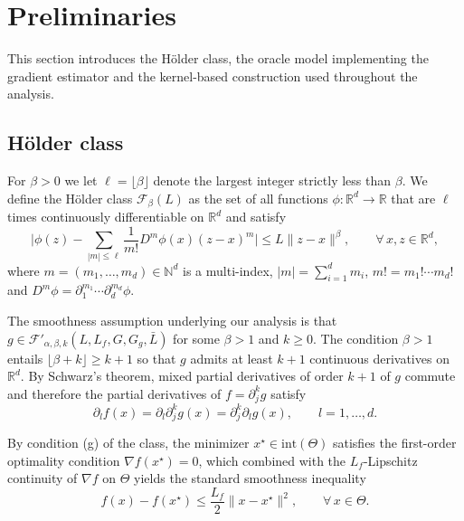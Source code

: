 \documentclass{article}
\renewcommand{\leq}{\leqslant}
\renewcommand{\geq}{\geqslant}
\theoremstyle{definition}
\begin{document}
\section{Preliminaries}
\label{sec:prel}

This section introduces the H\"older class, the oracle model 
implementing the gradient estimator and the kernel-based 
construction used throughout the analysis.

\subsection{H\"older class}

For $\beta>0$ we let $\ell=\lfloor\beta\rfloor$ denote the largest integer 
strictly less than $\beta$. %
We define the H\"older class 
$\mathcal{F}_\beta(L)$ as the set of all functions 
$\phi:\mathbb{R}^d\to\mathbb{R}$ that are $\ell$ times 
continuously differentiable on $\mathbb{R}^d$ and satisfy
\begin{equation}
\label{eq:holder}
\biggl|\phi(z)-\sum_{|m|\leq\ell}\frac{1}{m!}D^m\phi(x)(z-x)^m
\biggr|\leq L\|z-x\|^\beta,
\qquad\forall\,x,z\in\mathbb{R}^d,
\end{equation}
where $m=(m_1,\dots,m_d)\in\mathbb{N}^d$ is a multi-index, 
$|m|=\sum_{i=1}^d m_i$, $m!=m_1!\cdots m_d!$ and 
$D^m\phi=\partial_1^{m_1}\cdots\partial_d^{m_d}\phi$. 

\medskip

The smoothness assumption underlying our analysis is that 
$g\in\mathcal{F}'_{\alpha,\beta,k}(L,L_f,G,G_g,\bar{L})$ for some 
$\beta>1$ and $k\geq 0$. The condition $\beta>1$ entails 
$\lfloor\beta+k\rfloor\geq k+1$ so that $g$ admits at least 
$k+1$ continuous derivatives on $\mathbb{R}^d$. By Schwarz's 
theorem, mixed partial derivatives of order $k+1$ of $g$ commute 
and therefore the partial derivatives of $f=\partial_j^k g$ 
satisfy
\begin{equation}
\label{eq:schwarz}
\partial_l f(x)=\partial_l\partial_j^k g(x)
=\partial_j^k\partial_l g(x),\qquad l=1,\dots,d.
\end{equation}

By condition (g) of the class, the minimizer 
$x^\star\in\mathrm{int}(\Theta)$ satisfies the first-order 
optimality condition $\nabla f(x^\star)=0$, which combined with 
the $L_f$-Lipschitz continuity of $\nabla f$ on $\Theta$ yields 
the standard smoothness inequality
\begin{equation}
\label{eq:smoothness}
f(x)-f(x^\star)\leq\frac{L_f}{2}\|x-x^\star\|^2,
\qquad\forall\,x\in\Theta.
\end{equation}
\end{document}
